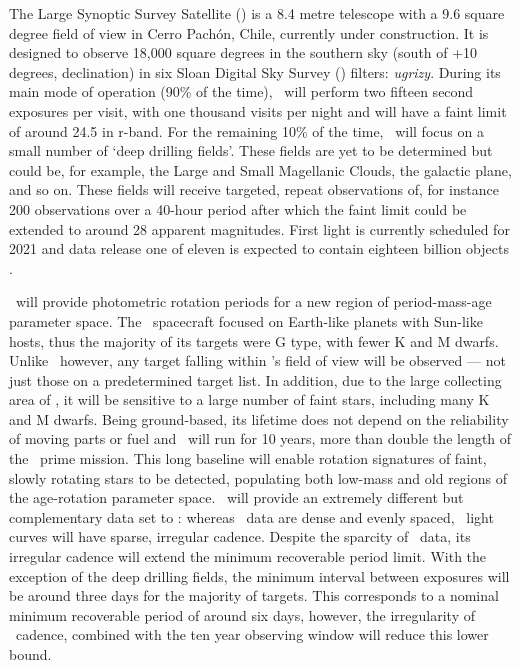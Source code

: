 The Large Synoptic Survey Satellite (\LSST) is a 8.4 metre telescope with a
9.6 square degree field of view in Cerro Pach\'{o}n, Chile, currently under
construction.
It is designed to observe 18,000 square degrees in the southern sky (south of
+10 degrees, declination) in six Sloan Digital Sky Survey (\SDSS) filters:
{\it ugrizy}.
During its main mode of operation (90\% of the time), \LSST\ will perform two
fifteen second exposures per visit, with one thousand visits per night and
will have a faint limit of around 24.5 in r-band.
For the remaining 10\% of the time, \LSST\ will focus on a small number of
`deep drilling fields'.
These fields are yet to be determined but could be, for example, the Large and
Small Magellanic Clouds, the galactic plane, and so on.
These fields will receive targeted, repeat observations of, for instance 200
observations over a 40-hour period after which the faint limit could be
extended to around 28 apparent magnitudes.
First light is currently scheduled for 2021 and data release one of eleven is
expected to contain eighteen billion objects \citep{Ivezic2008}.

\LSST\ will provide photometric rotation periods for a new region of
period-mass-age parameter space.
The \kepler\ spacecraft focused on Earth-like planets with Sun-like hosts,
thus the majority of its targets were G type, with fewer K and M dwarfs.
Unlike \kepler\ however, any target falling within \LSST's field of view will
be observed --- not just those on a predetermined target list.
In addition, due to the large collecting area of \LSST, it will be sensitive
to a large number of faint stars, including many K and M dwarfs.
Being ground-based, its lifetime does not depend on the reliability of moving
parts or fuel and \LSST\ will run for 10 years, more than double the length of
the \kepler\ prime mission.
This long baseline will enable rotation signatures of faint, slowly rotating
stars to be detected, populating both low-mass and old regions of the
age-rotation parameter space.
\LSST\ will provide an extremely different but complementary data set to
\kepler: whereas \kepler\ data are dense and evenly spaced, \LSST\ light
curves will have sparse, irregular cadence.
Despite the sparcity of \LSST\ data, its irregular cadence will extend the
minimum recoverable period limit.
With the exception of the deep drilling fields, the minimum interval
between exposures will be around three days for the majority of targets.
This corresponds to a nominal minimum recoverable period of around six days,
however, the irregularity of \LSST\ cadence, combined with the ten year
observing window will reduce this lower bound.

